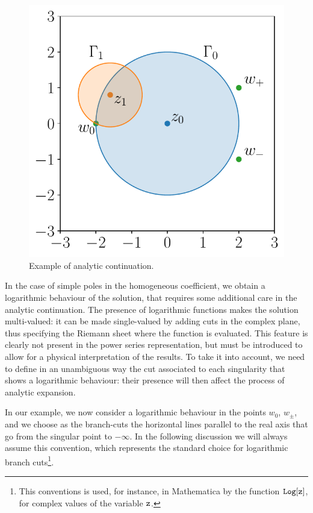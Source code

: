 \documentclass[final,1p,times]{elsarticle}
\begin{document}
\begin{figure}[t]
\centering
\includegraphics[width=0.5 \textwidth]{analytic_continuation.pdf}
\caption{\label{fig:analcont}
  Example of analytic continuation.}
\end{figure}

In the case of simple poles in the homogeneous coefficient, we obtain a logarithmic behaviour of the solution, that requires some additional care in the analytic continuation.
The presence of logarithmic functions makes the solution multi-valued: it can be made single-valued by adding cuts in the complex plane, thus specifying the Riemann sheet where the function is evaluated.
This feature is clearly not present in the power series representation, but must be introduced to allow for a physical interpretation of the results.
To take it into account, we need to define in an unambiguous way the cut associated to each singularity that shows a logarithmic behaviour: their presence will then affect the process of analytic expansion.

In our example, we now consider a logarithmic behaviour in the points $w_0$, $w_\pm$, and we choose as the branch-cuts the horizontal lines parallel to the real axis that go from the singular point to $-\infty$.
In the following discussion we will always assume this convention,
which represents the standard choice for logarithmic branch cuts\footnote{This conventions is used, for instance, in {\sc Mathematica} by the function $\tt{Log[z]}$, for complex values of the variable $\tt{z}$.}.
\end{document}

